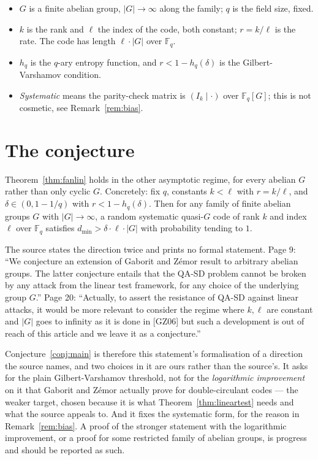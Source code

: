 \documentclass{aicr-conjecture}
\newcommand{\Fq}{\mathbb{F}_{q}}
\newcommand{\FqG}{\mathbb{F}_{q}[G]}
\newcommand{\dmin}{d_{\min}}
\newcommand{\hq}{h_{q}}
\begin{document}
\begin{itemize}[nosep]
  \item $G$ is a finite abelian group, $|G| \to \infty$ along the family;
    $q$ is the field size, fixed.
  \item $k$ is the rank and $\ell$ the index of the code, both constant;
    $r = k/\ell$ is the rate. The code has length $\ell \cdot |G|$ over
    $\Fq$.
  \item $\hq$ is the $q$-ary entropy function, and
    $r < 1 - \hq(\delta)$ is the Gilbert-Varshamov condition.
  \item \emph{Systematic} means the parity-check matrix is
    $(I_k \mid \cdot)$ over $\FqG$; this is not cosmetic, see
    Remark~\ref{rem:bias}.
\end{itemize}

\section{The conjecture}\label{sec:conjectures}

\begin{conjecture}\label{conj:main}
Theorem~\ref{thm:fanlin} holds in the other asymptotic regime, for every
abelian $G$ rather than only cyclic $G$. Concretely: fix $q$, constants
$k < \ell$ with $r = k/\ell$, and $\delta \in (0, 1-1/q)$ with
$r < 1 - \hq(\delta)$. Then for any family of finite abelian groups $G$
with $|G| \to \infty$, a random systematic quasi-$G$ code of rank $k$ and
index $\ell$ over $\Fq$ satisfies
$\dmin > \delta \cdot \ell \cdot |G|$ with probability tending to $1$.
\end{conjecture}

\begin{remark}\label{rem:framing}
The source states the direction twice and prints no formal statement.
Page 9: ``We conjecture an extension of Gaborit and Z\'emor result to
arbitrary abelian groups. The latter conjecture entails that the QA-SD
problem cannot be broken by any attack from the linear test framework,
for any choice of the underlying group $G$.'' Page 20: ``Actually, to
assert the resistance of QA-SD against linear attacks, it would be more
relevant to consider the regime where $k, \ell$ are constant and $|G|$
goes to infinity as it is done in [GZ06] but such a development is out of
reach of this article and we leave it as a conjecture.''

Conjecture~\ref{conj:main} is therefore this statement's formalisation of
a direction the source names, and two choices in it are ours rather than
the source's. It asks for the plain Gilbert-Varshamov threshold, not for
the \emph{logarithmic improvement} on it that Gaborit and Z\'emor
actually prove for double-circulant codes --- the weaker target, chosen
because it is what Theorem~\ref{thm:lineartest} needs and what the source
appeals to. And it fixes the systematic form, for the reason in
Remark~\ref{rem:bias}. A proof of the stronger statement with the
logarithmic improvement, or a proof for some restricted family of abelian
groups, is progress and should be reported as such.
\end{remark}
\end{document}
